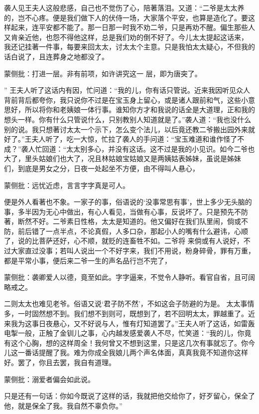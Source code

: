 \begin{parag}
    袭人见王夫人这般悲感，自己也不觉伤了心，陪著落泪。又道：“二爷是太太养的，岂不心疼。便是我们做下人的伏侍一场，大家落个平安，也算是造化了。要这样起来，连平安都不能了。那一日那一时我不劝二爷，只是再劝不醒。偏生那些人又肯亲近他，也怨不得他这样，总是我们劝的倒不好了。今儿太太提起这话来， 我还记挂著一件事，每要来回太太，讨太太个主意。只是我怕太太疑心，不但我的话白说了，且连葬身之地都没了。\begin{note}蒙侧批：打进一层。非有前项，如许讲究这一 层，即为唐突了。\end{note}” 王夫人听了这话内有因，忙问道：“我的儿，你有话只管说。近来我因听见众人背前背后都夸你，我只说你不过是在宝玉身上留心，或是诸人跟前和气，这些小意思好，所以将你和老姨娘一体行事。谁知你方才和我说的话全是大道理，正和我的想头一样。你有什么只管说什么，只别教别人知道就是了。”袭人道：“我也没什么 别的说。我只想著讨太太一个示下，怎么变个法儿，以后竟还教二爷搬出园外来就好了。”王夫人听了，吃一大惊，忙拉了袭人的手问道：“宝玉难道和谁作怪了不成？”袭人忙回道：“太太别多心，并没有这话。这不过是我的小见识。如今二爷也大了，里头姑娘们也大了，况且林姑娘宝姑娘又是两姨姑表姊妹，虽说是姊妹 们，到底是男女之分，日夜一处起坐不方便，由不得叫人悬心，\begin{note}蒙侧批：远忧近虑，言言字字真是可人。\end{note}便是外人看著也不象。一家子的事，俗语说的‘没事常思有事’，世上多少无头脑的事，多半因为无心中做出，有心人看见，当做有心事，反说坏了。只是预先不防著，断然不好。二爷素日性格，太太是知道的。他又偏好在我们队里闹，倘或不防，前后错了一点半点，不论真假，人多口杂，那起小人的嘴有什么避讳，心顺了，说的比菩萨还好，心不顺，就贬的连畜牲不如。二爷将 来倘或有人说好，不过大家直过没事；若叫人说出一个不好字来，我们不用说，粉身碎骨，罪有万重，都是平常小事，便后来二爷一生的声名品行岂不完了，\begin{note}蒙侧批：袭卿爱人以德，竟至如此。字字逼来，不觉令人静听。看官自省，且可阔略戒之。\end{note}二则太太也难见老爷。俗语又说‘君子防不然’，不如这会子防避的为是。 太太事情多，一时固然想不到。我们想不到则可，既想到了，若不回明太太，罪越重了。近来我为这事日夜悬心，又不好说与人，惟有灯知道罢了。”王夫人听了这话，如雷轰电掣一般，正触了金钏儿之事，心内越发感爱袭人不尽，忙笑道：“我的儿，你竟有这个心胸，想的这样周全！我何曾又不想到这里，只是这几次有事就忘了。你今儿这一番话提醒了我。难为你成全我娘儿两个声名体面，真真我竟不知道你这样好。罢了，你且去罢，我自有道理。\begin{note}蒙侧批：溺爱者偏会如此说。\end{note}只是还有一句话：你如今既说了这样的话，我就把他交给你了，好歹留心，保全了他，就是保全了我。我自然不辜负你。”
\end{parag}



